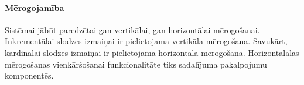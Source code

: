 \paragraph{Mērogojamība}

Sistēmai jābūt paredzētai gan vertikālai, gan horizontālai mērogošanai.
Inkrementālai slodzes izmaiņai ir pielietojama vertikāla mērogošana.
Savukārt, kardinālai slodzes izmaiņai ir pielietojama horizontālā merogošana.
Horizontālālās mērogošanas vienkāršošanai funkcionalitāte tiks sadalījuma pakalpojumu komponentēs.
